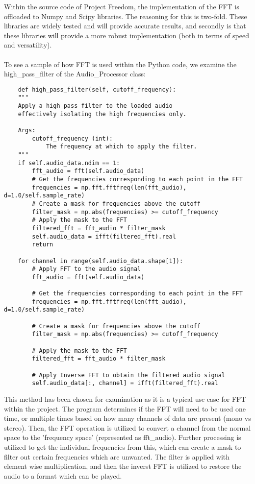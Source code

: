 \documentclass[notitlepage]{article}
\begin{document}
Within the source code of Project Freedom, the implementation of the FFT
is offloaded to Numpy and Scipy libraries. The reasoning for this is two-fold.
These libraries are widely tested and will provide accurate results, and
secondly is that these libraries will provide a more robust implementation
(both in terms of speed and versatility).
\\\\
To see a sample of how FFT is used within the Python code, we examine the
high\_pass\_filter of the Audio\_Processor class:
\begin{lstlisting}
    def high_pass_filter(self, cutoff_frequency):
    """
    Apply a high pass filter to the loaded audio
    effectively isolating the high frequencies only.

    Args:
        cutoff_frequency (int): 
            The frequency at which to apply the filter.
    """
    if self.audio_data.ndim == 1:
        fft_audio = fft(self.audio_data)
        # Get the frequencies corresponding to each point in the FFT
        frequencies = np.fft.fftfreq(len(fft_audio), d=1.0/self.sample_rate)
        # Create a mask for frequencies above the cutoff
        filter_mask = np.abs(frequencies) >= cutoff_frequency
        # Apply the mask to the FFT
        filtered_fft = fft_audio * filter_mask
        self.audio_data = ifft(filtered_fft).real
        return
    
    for channel in range(self.audio_data.shape[1]):
        # Apply FFT to the audio signal
        fft_audio = fft(self.audio_data)

        # Get the frequencies corresponding to each point in the FFT
        frequencies = np.fft.fftfreq(len(fft_audio), d=1.0/self.sample_rate)

        # Create a mask for frequencies above the cutoff
        filter_mask = np.abs(frequencies) >= cutoff_frequency

        # Apply the mask to the FFT
        filtered_fft = fft_audio * filter_mask

        # Apply Inverse FFT to obtain the filtered audio signal
        self.audio_data[:, channel] = ifft(filtered_fft).real
\end{lstlisting}

This method has been chosen for examination as it is a typical use case for FFT within
the project. The program determines if the FFT will need to be used one time, or multiple
times based on how many channels of data are present (mono vs stereo). Then, the FFT
operation is utilized to convert a channel from the normal space to the 'frequency space'
(represented as fft\_audio). Further processing is utilized to get the individual frequencies
from this, which can create a mask to filter out certain frequencies which are unwanted.
The filter is applied with element wise multiplication, and then the inverst FFT is utilized
to restore the audio to a format which can be played.
\end{document}
